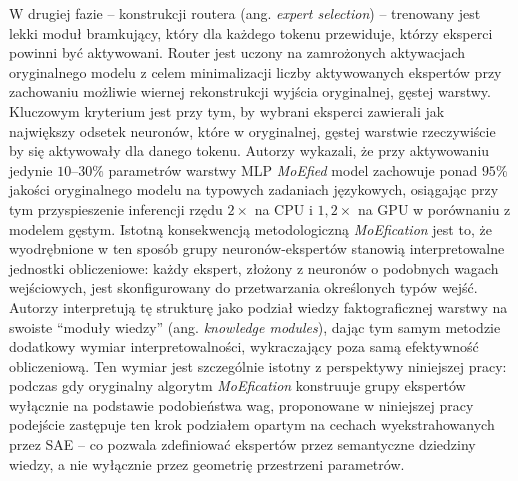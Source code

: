 W drugiej fazie -- konstrukcji routera (ang. \textit{expert selection}) -- trenowany jest lekki moduł bramkujący, który dla każdego tokenu przewiduje, którzy eksperci powinni być aktywowani. Router jest uczony na zamrożonych aktywacjach oryginalnego modelu z celem minimalizacji liczby aktywowanych ekspertów przy zachowaniu możliwie wiernej rekonstrukcji wyjścia oryginalnej, gęstej warstwy. Kluczowym kryterium jest przy tym, by wybrani eksperci zawierali jak największy odsetek neuronów, które w oryginalnej, gęstej warstwie rzeczywiście by się aktywowały dla danego tokenu. Autorzy wykazali, że przy aktywowaniu jedynie $10$--$30\%$ parametrów warstwy MLP \textit{MoEfied} model zachowuje ponad $95\%$ jakości oryginalnego modelu na typowych zadaniach językowych, osiągając przy tym przyspieszenie inferencji rzędu $2\times$ na CPU i $1{,}2\times$ na GPU w porównaniu z modelem gęstym. \newline
Istotną konsekwencją metodologiczną \textit{MoEfication} jest to, że wyodrębnione w ten sposób grupy neuronów-ekspertów stanowią interpretowalne jednostki obliczeniowe: każdy ekspert, złożony z neuronów o podobnych wagach wejściowych, jest skonfigurowany do przetwarzania określonych typów wejść. Autorzy interpretują tę strukturę jako podział wiedzy faktograficznej warstwy na swoiste \enquote{moduły wiedzy} (ang. \textit{knowledge modules}), dając tym samym metodzie dodatkowy wymiar interpretowalności, wykraczający poza samą efektywność obliczeniową. Ten wymiar jest szczególnie istotny z perspektywy niniejszej pracy: podczas gdy oryginalny algorytm \textit{MoEfication} konstruuje grupy ekspertów wyłącznie na podstawie podobieństwa wag, proponowane w niniejszej pracy podejście zastępuje ten krok podziałem opartym na cechach wyekstrahowanych przez SAE -- co pozwala zdefiniować ekspertów przez semantyczne dziedziny wiedzy, a nie wyłącznie przez geometrię przestrzeni parametrów. \newline
